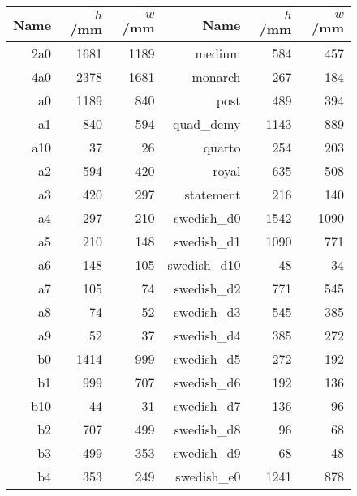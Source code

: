 \begin{figure}
\tiny \center
\begin{tabular}{|rrr|rrr|}
\hline
{\bf Name} & {\bf $h$/mm} & {\bf $w$/mm} & {\bf Name} & {\bf $h$/mm} & {\bf $w$/mm} \\
\hline
                       2a0 &   1681 &   1189 &           medium &    584 &    457 \\
                       4a0 &   2378 &   1681 &          monarch &    267 &    184 \\
                        a0 &   1189 &    840 &             post &    489 &    394 \\
                        a1 &    840 &    594 &        quad\_demy &   1143 &   889 \\
                       a10 &     37 &     26 &           quarto &    254 &    203 \\
                        a2 &    594 &    420 &            royal &    635 &    508 \\
                        a3 &    420 &    297 &        statement &    216 &    140 \\
                        a4 &    297 &    210 &       swedish\_d0 &   1542 &   1090 \\
                        a5 &    210 &    148 &       swedish\_d1 &   1090 &    771 \\
                        a6 &    148 &    105 &      swedish\_d10 &     48 &     34 \\
                        a7 &    105 &     74 &       swedish\_d2 &    771 &    545 \\
                        a8 &     74 &     52 &       swedish\_d3 &    545 &    385 \\
                        a9 &     52 &     37 &       swedish\_d4 &    385 &    272 \\
                        b0 &   1414 &    999 &       swedish\_d5 &    272 &    192 \\
                        b1 &    999 &    707 &       swedish\_d6 &    192 &    136 \\
                       b10 &     44 &     31 &       swedish\_d7 &    136 &     96 \\
                        b2 &    707 &    499 &       swedish\_d8 &     96 &     68 \\
                        b3 &    499 &    353 &       swedish\_d9 &     68 &     48 \\
                        b4 &    353 &    249 &       swedish\_e0 &   1241 &    878 \\

\end{tabular}
\end{figure}
